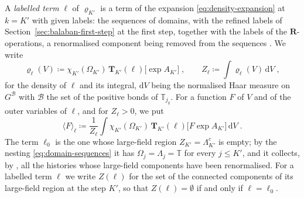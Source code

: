 \documentclass[11pt]{preprint}
\newcommand{\dd}{\mathrm{d}}
\numberwithin{equation}{section}
\theoremstyle{definition}
\theoremstyle{remark}
\theoremstyle{plain}
\begin{document}
A \emph{labelled term} $\ell$ of $\varrho_{K'}$ is a term of the expansion \eqref{eq:density-expansion} at $k = K'$ with given labels: the sequences of domains, with the refined labels of Section~\ref{sec:balaban-first-step} at the first step, together with the labels of the $\mathbf R$-operations, a renormalised component being removed from the sequences \cite[(0.3), p.~176]{BalabanLFR1}. We write
\begin{equation}\label{eq:term-integral}
    \varrho_\ell(V) \coloneqq \chi_{K'}(\Omega_{K'})\,\mathbf T_{K'}(\ell)\bigl[\exp A_{K'}\bigr]\;,
    \qquad
    Z_\ell \coloneqq \int\varrho_\ell(V)\,\dd V\;,
\end{equation}
for the density of $\ell$ and its integral, $\dd V$ being the normalised Haar measure on $G^{\mathcal B}$ with $\mathcal B$ the set of the positive bonds of $\mathbb T_{j_q}$. For a function $F$ of $V$ and of the outer variables of $\ell$, and for $Z_\ell > 0$, we put
\begin{equation}\label{eq:term-expectation}
    \langle F\rangle_\ell \coloneqq \frac{1}{Z_\ell}\int\chi_{K'}(\Omega_{K'})\,\mathbf T_{K'}(\ell)\bigl[F\exp A_{K'}\bigr]\,\dd V\;.
\end{equation}
The term $\ell_0$ is the one whose large-field region $Z_{K'} = \Lambda_{K'}^c$ is empty; by the nesting \eqref{eq:domain-sequences} it has $\Omega_j = \Lambda_j = \mathbb T$ for every $j \leq K'$, and it collects, by \cite[(0.6), p.~176]{BalabanLFR1}, all the histories whose large-field components have been renormalised. For a labelled term $\ell$ we write $Z(\ell)$ for the set of the connected components of its large-field region at the step $K'$, so that $Z(\ell) = \emptyset$ if and only if $\ell = \ell_0$.
\end{document}
